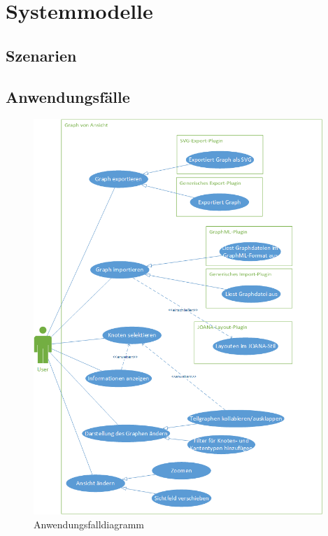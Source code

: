 \chapter{Systemmodelle}
\label{ch:sysmodel}

\section{Szenarien}
\newpage
\section{Anwendungsfälle}

\begin{figure}[ht]
	\centering
	\includegraphics[width=310pt]{resourcen/usecase.png}
	\caption{Anwendungsfalldiagramm}
	\label{fig:usecase}
\end{figure}